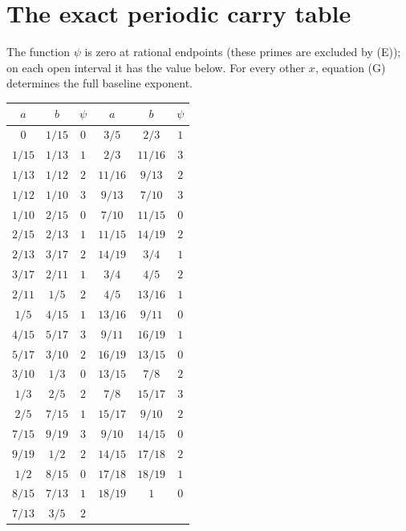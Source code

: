 \documentclass[11pt]{article}
\begin{document}
\appendix
\section{The exact periodic carry table}
The function $\psi$ is zero at rational endpoints (these primes are
excluded by (E)); on each open interval it has the value below.
For every other $x$, equation (G) determines the full baseline exponent.
\begin{center}\small
\begin{tabular}{ccc@{\qquad}ccc}\toprule
$a$&$b$&$\psi$&$a$&$b$&$\psi$\\\midrule

$0$&$1/15$&$0$&$3/5$&$2/3$&$1$\\[0pt]

$1/15$&$1/13$&$1$&$2/3$&$11/16$&$3$\\[0pt]

$1/13$&$1/12$&$2$&$11/16$&$9/13$&$2$\\[0pt]

$1/12$&$1/10$&$3$&$9/13$&$7/10$&$3$\\[0pt]

$1/10$&$2/15$&$0$&$7/10$&$11/15$&$0$\\[0pt]

$2/15$&$2/13$&$1$&$11/15$&$14/19$&$2$\\[0pt]

$2/13$&$3/17$&$2$&$14/19$&$3/4$&$1$\\[0pt]

$3/17$&$2/11$&$1$&$3/4$&$4/5$&$2$\\[0pt]

$2/11$&$1/5$&$2$&$4/5$&$13/16$&$1$\\[0pt]

$1/5$&$4/15$&$1$&$13/16$&$9/11$&$0$\\[0pt]

$4/15$&$5/17$&$3$&$9/11$&$16/19$&$1$\\[0pt]

$5/17$&$3/10$&$2$&$16/19$&$13/15$&$0$\\[0pt]

$3/10$&$1/3$&$0$&$13/15$&$7/8$&$2$\\[0pt]

$1/3$&$2/5$&$2$&$7/8$&$15/17$&$3$\\[0pt]

$2/5$&$7/15$&$1$&$15/17$&$9/10$&$2$\\[0pt]

$7/15$&$9/19$&$3$&$9/10$&$14/15$&$0$\\[0pt]

$9/19$&$1/2$&$2$&$14/15$&$17/18$&$2$\\[0pt]

$1/2$&$8/15$&$0$&$17/18$&$18/19$&$1$\\[0pt]

$8/15$&$7/13$&$1$&$18/19$&$1$&$0$\\[0pt]

$7/13$&$3/5$&$2$&&&\\[0pt]

\bottomrule\end{tabular}\end{center}
\end{document}
